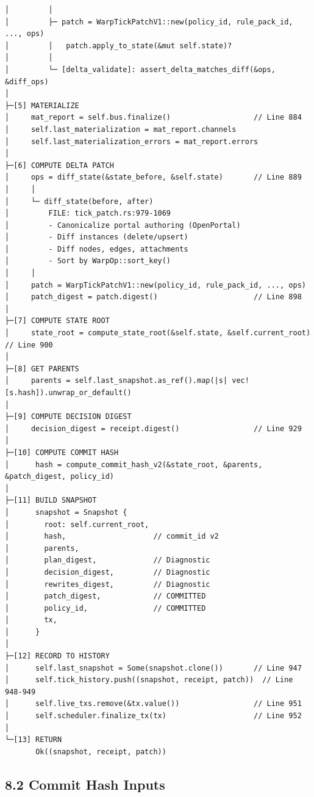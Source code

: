 \documentclass[
]{book}
\begin{document}
\begin{verbatim}
│         │
│         ├─ patch = WarpTickPatchV1::new(policy_id, rule_pack_id, ..., ops)
│         │   patch.apply_to_state(&mut self.state)?
│         │
│         └─ [delta_validate]: assert_delta_matches_diff(&ops, &diff_ops)
│
├─[5] MATERIALIZE
│     mat_report = self.bus.finalize()                   // Line 884
│     self.last_materialization = mat_report.channels
│     self.last_materialization_errors = mat_report.errors
│
├─[6] COMPUTE DELTA PATCH
│     ops = diff_state(&state_before, &self.state)       // Line 889
│     │
│     └─ diff_state(before, after)
│         FILE: tick_patch.rs:979-1069
│         - Canonicalize portal authoring (OpenPortal)
│         - Diff instances (delete/upsert)
│         - Diff nodes, edges, attachments
│         - Sort by WarpOp::sort_key()
│     │
│     patch = WarpTickPatchV1::new(policy_id, rule_pack_id, ..., ops)
│     patch_digest = patch.digest()                      // Line 898
│
├─[7] COMPUTE STATE ROOT
│     state_root = compute_state_root(&self.state, &self.current_root)  // Line 900
│
├─[8] GET PARENTS
│     parents = self.last_snapshot.as_ref().map(|s| vec![s.hash]).unwrap_or_default()
│
├─[9] COMPUTE DECISION DIGEST
│     decision_digest = receipt.digest()                 // Line 929
│
├─[10] COMPUTE COMMIT HASH
│      hash = compute_commit_hash_v2(&state_root, &parents, &patch_digest, policy_id)
│
├─[11] BUILD SNAPSHOT
│      snapshot = Snapshot {
│        root: self.current_root,
│        hash,                    // commit_id v2
│        parents,
│        plan_digest,             // Diagnostic
│        decision_digest,         // Diagnostic
│        rewrites_digest,         // Diagnostic
│        patch_digest,            // COMMITTED
│        policy_id,               // COMMITTED
│        tx,
│      }
│
├─[12] RECORD TO HISTORY
│      self.last_snapshot = Some(snapshot.clone())       // Line 947
│      self.tick_history.push((snapshot, receipt, patch))  // Line 948-949
│      self.live_txs.remove(&tx.value())                 // Line 951
│      self.scheduler.finalize_tx(tx)                    // Line 952
│
└─[13] RETURN
       Ok((snapshot, receipt, patch))
\end{verbatim}

\subsection{8.2 Commit Hash Inputs}\label{commit-hash-inputs}
\end{document}

